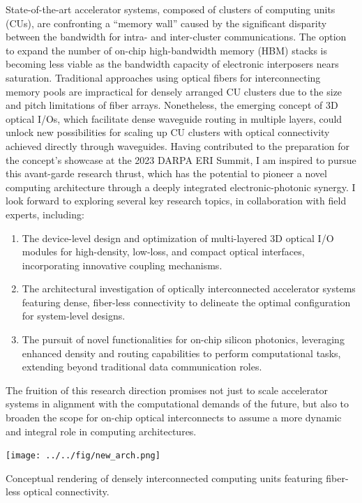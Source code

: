 State-of-the-art accelerator systems, composed of clusters of computing units (CUs), are confronting a ``memory wall'' caused by the significant disparity between the bandwidth for intra- and inter-cluster communications. The option to expand the number of on-chip high-bandwidth memory (HBM) stacks is becoming less viable as the bandwidth capacity of electronic interposers nears saturation. Traditional approaches using optical fibers for interconnecting memory pools are impractical for densely arranged CU clusters due to the size and pitch limitations of fiber arrays. Nonetheless, the emerging concept of 3D optical I/Os, which facilitate dense waveguide routing in multiple layers, could unlock new possibilities for scaling up CU clusters with optical connectivity achieved directly through waveguides. Having contributed to the preparation for the concept's showcase at the 2023 DARPA ERI Summit, I am inspired to pursue this avant-garde research thrust, which has the potential to pioneer a novel computing architecture through a deeply integrated electronic-photonic synergy. I look forward to exploring several key research topics, in collaboration with field experts, including:
\begin{enumerate}[nosep]
    \item The device-level design and optimization of multi-layered 3D optical I/O modules for high-density, low-loss, and compact optical interfaces, incorporating innovative coupling mechanisms.
    \item The architectural investigation of optically interconnected accelerator systems featuring dense, fiber-less connectivity to delineate the optimal configuration for system-level designs.
    \item The pursuit of novel functionalities for on-chip silicon photonics, leveraging enhanced density and routing capabilities to perform computational tasks, extending beyond traditional data communication roles.
\end{enumerate}
The fruition of this research direction promises not just to scale accelerator systems in alignment with the computational demands of the future, but also to broaden the scope for on-chip optical interconnects to assume a more dynamic and integral role in computing architectures.

\begin{marginfigure}%
    \texttt{[image: ../../fig/new\_arch.png]}
    \caption{Conceptual rendering of densely interconnected computing units featuring fiber-less optical connectivity.}
    \label{fig:new_arch}
\end{marginfigure}

